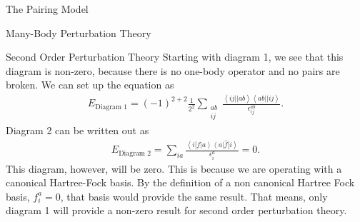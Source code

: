 \documentclass[twoside,english]{uiofysmaster}
\begin{document}
\begin{chapter}{The Pairing Model}
\begin{section}{Many-Body Perturbation Theory}
		\begin{subsection}{Second Order Perturbation Theory}
			Starting with diagram 1, we see that this diagram is non-zero, because there is no one-body operator and no pairs are broken. We can set up the equation as
			\begin{align}
				E_\text{Diagram 1} = (-1)^{2+2} \frac{1}{2^2} \sum_{\substack{ab \\ ij}} \frac{\left< ij || ab \right> \left< ab || ij \right>}{\epsilon_{ij}^{ab}}.
			\end{align}
			Diagram 2 can be written out as
			\begin{align}
				E_\text{Diagram 2} = \sum_{ia} \frac{\left<i\right|f\left|a\right> \left<a\right| \hat f \left| i \right>}{\epsilon_i^a} = 0.
			\end{align}
			This diagram, however, will be zero. This is because we are operating with a canonical Hartree-Fock basis. By the definition of a non canonical Hartree Fock basis, $f_i^a = 0$, that basis would provide the same result. That means, only diagram 1 will provide a non-zero result for second order perturbation theory. 

		\end{subsection}


\end{section}
\end{chapter}
\end{document}
